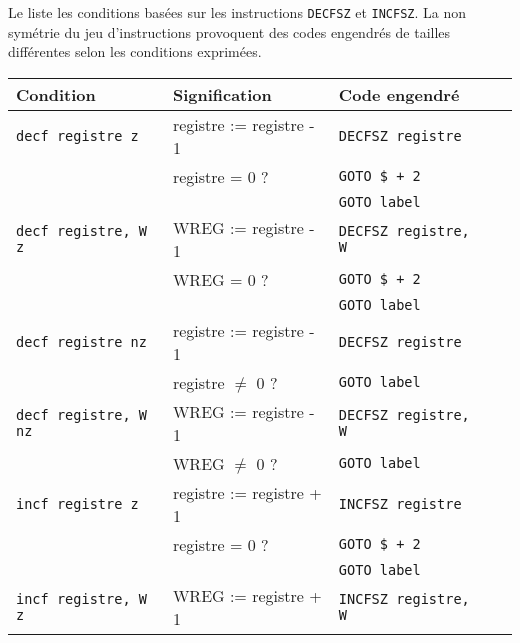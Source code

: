 Le  liste les conditions basées sur les instructions \texttt{DECFSZ} et \texttt{INCFSZ}. La non symétrie du jeu d'instructions provoquent des codes engendrés de tailles différentes selon les conditions exprimées. 

\begin{table}[!ht]
  \centering
  \small
  \begin{tabular}{lllll}
    \textbf{Condition} & \textbf{Signification} & \textbf{Code engendré}\\
    \hline
                           \texttt{decf registre z}   & registre := registre - 1    &\texttt{DECFSZ registre}\\
                                                      & registre = 0 ?              &\texttt{GOTO \$ + 2}      \\
                                                      &                             &\texttt{GOTO label}      \\
    \rowcolor{\fondTableau}\texttt{decf registre, W z}& WREG := registre - 1 &\texttt{DECFSZ registre, W}  \\
    \rowcolor{\fondTableau}                           & WREG = 0 ?           &\texttt{GOTO \$ + 2}          \\
    \rowcolor{\fondTableau}                           &                      &\texttt{GOTO label}          \\
                           \texttt{decf registre nz}  & registre := registre - 1    &\texttt{DECFSZ registre} \\
                                                      & registre $\ne$ 0 ?              &\texttt{GOTO label}   \\
    \rowcolor{\fondTableau}\texttt{decf registre, W nz}& WREG := registre - 1 &\texttt{DECFSZ registre, W}  \\
    \rowcolor{\fondTableau}                           & WREG $\ne$ 0 ?           &\texttt{GOTO label}        \\
                           \texttt{incf registre z}   & registre := registre + 1    &\texttt{INCFSZ registre} \\
                                                      & registre = 0 ?              &\texttt{GOTO \$ + 2}      \\
                                                      &                             &\texttt{GOTO label}      \\
    \rowcolor{\fondTableau}\texttt{incf registre, W z}& WREG := registre + 1 &\texttt{INCFSZ registre, W} \\

\end{tabular}
\end{table}
